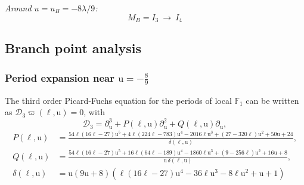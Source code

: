 \documentclass[11pt, a4paper]{article}
\newcommand{\ur}{\mathrm{u}}
\DeclareMathOperator{\Disc}{Disc} %
\numberwithin{equation}{section}
\begin{document}
\textit{Around $u = u_B = -8\lambda/9$:}
\begin{equation}
  M_B = I_3 \ \to \ I_4
\end{equation}





\subsection{Branch point analysis}
\subsubsection{Period expansion near \texorpdfstring{$\ur = -\frac{8}{9}$}{ur = -8/9}}
The third order Picard-Fuchs equation for the periods of local $\mathbb{F}_1$ can be written as $\mathcal{D}_3 \varpi(\ell, \ur) = 0$, with
\begin{equation}
  \mathcal{D}_3 = \partial_\ur^3 + P(\ell, \ur) \partial_\ur^2 + Q(\ell, \ur) \partial_\ur,
\end{equation}
\begin{equation}
  \begin{aligned}
    P(\ell, \ur) &= \frac{54 \ell (16 \ell-27) \ur^5+4 \ell (224 \ell-783) \ur^4-2016 \ell \ur^3+(27-320 \ell) \ur^2+50 \ur+24}{\delta(\ell, \ur)}, \\
    Q(\ell, \ur) &= \frac{54 \ell (16 \ell-27) \ur^5+16 \ell (64 \ell-189) \ur^4-1860 \ell \ur^3+(9-256 \ell) \ur^2+16 \ur+8}{\ur \, \delta(\ell, \ur)}, \\
    \delta(\ell, \ur) &= \ur (9 \ur+8) \left(\ell (16 \ell-27) \ur^4-36 \ell \ur^3-8 \ell \ur^2+\ur+1\right)
  \end{aligned}
\end{equation}
\end{document}
